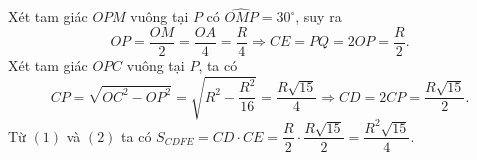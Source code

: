 \begin{bt}
{{
	}
\begin{enumEX}[b)]{1}
	\item Xét tam giác $ OPM $ vuông tại $ P $ có $ \widehat{OMP}=30^{\circ} $, suy ra
	\[ 
	OP=\dfrac{OM}{2}=\dfrac{OA}{4}=\dfrac{R}{4}\Rightarrow CE=PQ=2OP=\dfrac{R}{2}.\tag{1}
	\]
	Xét tam giác $ OPC $ vuông tại $ P $, ta có
	\[ 
	CP=\sqrt{OC^{2}-OP^{2}}=\sqrt{R^{2}-\dfrac{R^{2}}{16}}=\dfrac{R\sqrt{15}}{4}\Rightarrow CD=2CP=\dfrac{R\sqrt{15}}{2}.\tag{2}
	\]
	Từ $ (1) $ và $ (2) $ ta có $ S_{CDFE}=CD\cdot CE=\dfrac{R}{2}\cdot \dfrac{R\sqrt{15}}{2}=\dfrac{R^{2}\sqrt{15}}{4} $.
\end{enumEX}
}
\end{bt}
